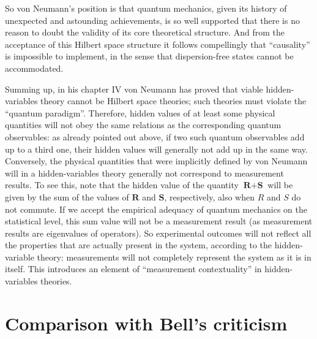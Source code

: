 \documentclass[12pt]{article}
\begin{document}
So von Neumann's position is that quantum mechanics, given its history of unexpected and astounding achievements, is so well supported that there is no reason to doubt the validity of its core theoretical structure. And from the acceptance of this Hilbert space structure it follows compellingly that ``causality'' is impossible to implement, in the sense that dispersion-free states cannot be accommodated.

Summing up, in his chapter IV von Neumann has proved that viable hidden-variables theory cannot be Hilbert space theories; such theories must violate the ``quantum paradigm''. Therefore, hidden values of at least some physical quantities will not obey the same relations as the corresponding quantum observables: as already pointed out above, if two such quantum observables add up to a third one, their hidden values will generally not add up in the same way.
Conversely, the physical quantities that were implicitly defined by von Neumann will in a hidden-variables theory generally not correspond to measurement results. To see this, note that the hidden value of the quantity $\textbf{R} + \textbf{S}$ will be given by the sum of the values of $\textbf{R}$ and $\textbf{S}$, respectively, also when $R$ and $S$ do not commute. If we accept the empirical adequacy of quantum mechanics on the statistical level, this sum value will not be a measurement result (as measurement results are eigenvalues of operators). So experimental outcomes will not reflect all the properties that are actually present in the system, according to the hidden-variable theory: measurements will not completely represent the system as it is in itself. This introduces an element of ``measurement contextuality'' in hidden-variables theories.



\section{Comparison with Bell's criticism}\label{Bell}
\end{document}
